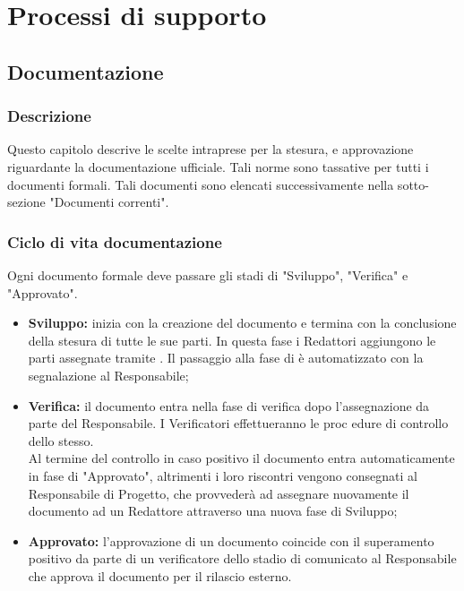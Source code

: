 \documentclass[NormeDiProgetto.tex]{subfiles}
\begin{document}
	
	\chapter{Processi di supporto}
	
	\section{Documentazione}
	\subsection{Descrizione}
	Questo capitolo descrive le scelte intraprese per la
	stesura,  e approvazione riguardante la documentazione ufficiale.
	Tali norme sono tassative per tutti i documenti formali.
	Tali documenti sono elencati successivamente nella sotto-sezione "Documenti correnti". 
	
	\subsection{Ciclo di vita documentazione}
	Ogni documento formale deve passare gli stadi di "Sviluppo", "Verifica" e "Approvato".
	\begin{itemize}
		\item \textbf{Sviluppo:} inizia con la creazione del documento e termina con la conclusione della stesura di tutte le sue parti. In questa fase i Redattori aggiungono le parti assegnate tramite .
		Il passaggio alla fase di  è automatizzato con la segnalazione al Responsabile;
		
		\item \textbf{Verifica:} il documento entra nella fase di verifica dopo l'assegnazione da parte del Responsabile. I Verificatori effettueranno le proc
		edure di controllo dello stesso.\\
		Al termine del controllo in caso positivo il documento entra automaticamente in fase di "Approvato", altrimenti i loro riscontri vengono consegnati al Responsabile di Progetto, che provvederà ad assegnare nuovamente il documento ad un Redattore attraverso una nuova fase di Sviluppo; 
		
		\item \textbf{Approvato:} l'approvazione di un documento coincide con il superamento positivo da parte di un verificatore dello stadio di  comunicato al Responsabile che approva il documento per il rilascio esterno.
	\end{itemize}
	
\end{document}
